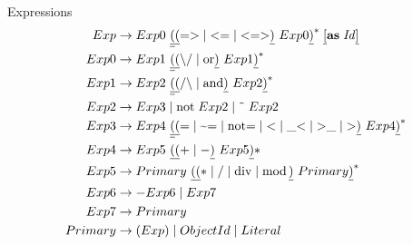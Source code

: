 \documentclass{article}%
\begin{document}
Expressions%
\begin{align*}
Exp  &  \rightarrow Exp0~\underline{\underline{(}}\underline{(}\text{=%
$>$%
}\mid\text{%
$<$%
=}\mid\text{%
$<$%
=%
$>$%
}\underline{)}~Exp0\underline{)}^{\ast}\;\underline{[}\mathbf{as}%
\mathit{\;Id}\underline{]}\\
Exp0  &  \rightarrow Exp1~\underline{\underline{(}}\underline{(}\text{%
$\backslash$%
/}\mid\text{or}\underline{)}~Exp1\underline{)}^{\ast}\\
Exp1  &  \rightarrow Exp2~\underline{\underline{(}}\underline{(}\text{/%
$\backslash$%
}\mid\text{and}\underline{)}~Exp2\underline{)}^{\ast}\\
Exp2  &  \rightarrow Exp3\mid\mathrm{not}\;Exp2\mid\mathrm{\symbol{126}%
}\;Exp2\\
Exp3  &  \rightarrow Exp4~\underline{\underline{(}}\underline{(}\text{=}%
\mid\text{\symbol{126}=}\mid\text{not=}\mid\text{%
$<$%
}\mid\text{\_%
$<$%
}\mid\text{%
$>$%
\_}\mid\text{%
$>$%
}\underline{)}~Exp4\underline{)}^{\ast}\\
Exp4  &  \rightarrow Exp5~\underline{(}\underline{(}+\mid-\underline{)}%
~Exp5\underline{)}\ast\\
Exp5  &  \rightarrow Primary~\underline{(}\underline{(}\ast\mid/\mid
\operatorname{div}\mid\operatorname{mod}\underline{)}~Primary\underline{)}%
^{\ast}\\
Exp6  &  \rightarrow -Exp6\mid Exp7\\
Exp7  &  \rightarrow Primary\\
Primary  &  \rightarrow(Exp) \mid ObjectId \mid Literal
\end{align*}
\end{document}

